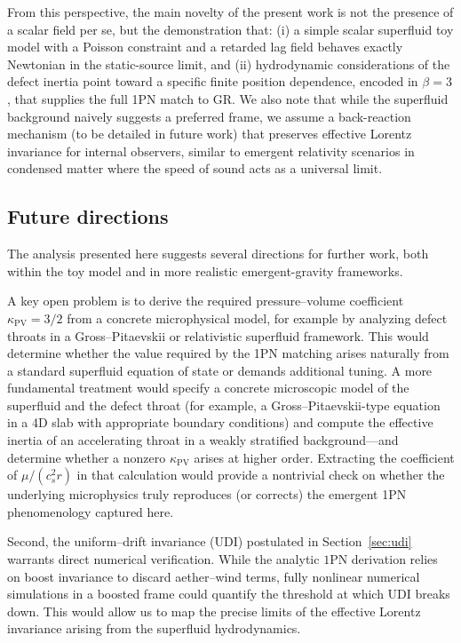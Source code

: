 \documentclass[11pt]{article}
\newcommand{\cS}{c_s}
\begin{document}
From this perspective, the main novelty of the present work is not the presence of a scalar field per se, but the demonstration that:
(i) a simple scalar superfluid toy model with a Poisson constraint and a retarded lag field behaves exactly Newtonian in the static-source limit, and
(ii) hydrodynamic considerations of the defect inertia point toward a specific finite position dependence, encoded in $\beta = 3$, that supplies the full 1PN match to GR. We also note that while the superfluid background naively suggests a preferred frame, we assume a back-reaction mechanism (to be detailed in future work) that preserves effective Lorentz invariance for internal observers, similar to emergent relativity scenarios in condensed matter where the speed of sound acts as a universal limit.

\subsection{Future directions}
\label{sec:discussion_future}

The analysis presented here suggests several directions for further work, both within the toy model and in more realistic emergent-gravity frameworks.

A key open problem is to derive the required pressure--volume coefficient $\kappa_{\mathrm{PV}} = 3/2$ from a concrete microphysical model, for example by analyzing defect throats in a Gross--Pitaevskii or relativistic superfluid framework. This would determine whether the value required by the 1PN matching arises naturally from a standard superfluid equation of state or demands additional tuning. A more fundamental treatment would specify a concrete microscopic model of the superfluid and the defect throat (for example, a Gross--Pitaevskii-type equation in a 4D slab with appropriate boundary conditions) and compute the effective inertia of an accelerating throat in a weakly stratified background—and determine whether a nonzero $\kappa_{\mathrm{PV}}$ arises at higher order. Extracting the coefficient of $\mu/(\cS^2 r)$ in that calculation would provide a nontrivial check on whether the underlying microphysics truly reproduces (or corrects) the emergent 1PN phenomenology captured here.

Second, the uniform--drift invariance (UDI) postulated in Section~\ref{sec:udi} warrants direct numerical verification. While the analytic $1$PN derivation relies on boost invariance to discard aether--wind terms, fully nonlinear numerical simulations in a boosted frame could quantify the threshold at which UDI breaks down. This would allow us to map the precise limits of the effective Lorentz invariance arising from the superfluid hydrodynamics.
\end{document}

